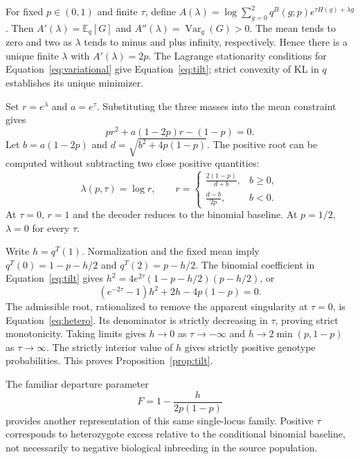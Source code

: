 \documentclass[11pt,a4paper]{article}
\newcommand{\E}{\mathbb{E}}
\newcommand{\Var}{\operatorname{Var}}
\begin{document}
For fixed $p\in(0,1)$ and finite $\tau$, define
$A(\lambda)=\log\sum_{g=0}^2q^B(g;p)e^{\tau H(g)+\lambda g}$.
Then $A'(\lambda)=\E_q[G]$ and $A''(\lambda)=\Var_q(G)>0$.
The mean tends to zero and two as $\lambda$ tends to minus and plus infinity,
respectively. Hence there is a unique finite $\lambda$ with
$A'(\lambda)=2p$. The Lagrange stationarity conditions for
Equation~\eqref{eq:variational} give Equation~\eqref{eq:tilt}; strict convexity
of KL in $q$ establishes its unique minimizer.

Set $r=e^\lambda$ and $a=e^\tau$. Substituting the three masses into the
mean constraint gives
\begin{equation}
 p r^2+a(1-2p)r-(1-p)=0.
 \label{eq:quadratic}
\end{equation}
Let $b=a(1-2p)$ and $d=\sqrt{b^2+4p(1-p)}$. The positive root can be
computed without subtracting two close positive quantities:
\begin{equation}
 \lambda(p,\tau)=\log r,\qquad
 r=\begin{cases}
 \displaystyle\frac{2(1-p)}{d+b},&b\ge0,\\[6pt]
 \displaystyle\frac{d-b}{2p},&b<0.
 \end{cases}
 \label{eq:lambda}
\end{equation}
At $\tau=0$, $r=1$ and the decoder reduces to the binomial baseline.
At $p=1/2$, $\lambda=0$ for every $\tau$.

Write $h=q^T(1)$. Normalization and the fixed mean imply
$q^T(0)=1-p-h/2$ and $q^T(2)=p-h/2$.
The binomial coefficient in Equation~\eqref{eq:tilt} gives
$h^2=4e^{2\tau}(1-p-h/2)(p-h/2)$, or
\begin{equation}
 (e^{-2\tau}-1)h^2+2h-4p(1-p)=0.
 \label{eq:hquadratic}
\end{equation}
The admissible root, rationalized to remove the apparent singularity at
$\tau=0$, is Equation~\eqref{eq:hetero}. Its denominator is strictly
decreasing in $\tau$, proving strict monotonicity. Taking limits gives
$h\to0$ as $\tau\to-\infty$ and
$h\to2\min(p,1-p)$ as $\tau\to\infty$.
The strictly interior value of $h$ gives strictly positive genotype
probabilities. This proves Proposition~\ref{prop:tilt}.

The familiar departure parameter
\begin{equation}
 F=1-\frac{h}{2p(1-p)}
 \label{eq:F}
\end{equation}
provides another representation of this same single-locus family.
Positive $\tau$ corresponds to heterozygote excess relative to the
conditional binomial baseline, not necessarily to negative biological
inbreeding in the source population.
\end{document}
